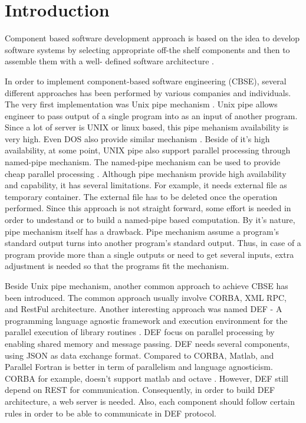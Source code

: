 \documentclass[conference]{IEEEtran}
\begin{document}
\section{Introduction}
Component based software development approach is based on
the idea to develop software systems by selecting appropriate
off-the shelf components and then to assemble them with a well-
defined software architecture \cite{kaur2010component}.

In order to implement component-based software engineering (CBSE), several different approaches has been performed by various companies and individuals. The very first implementation was Unix pipe mechanism \cite{mcilroy1968mass}. Unix pipe allows engineer to pass output of a single program into as an input of another program. Since a lot of server is UNIX or linux based, this pipe mehanism availability is very high. Even DOS also provide similar mechanism \cite{dos7command}. Beside of it's high availability, at some point, UNIX pipe also support parallel processing through named-pipe mechanism. The named-pipe mechanism can be used to provide cheap parallel processing \cite{conway2003parallel}. Although pipe mechanism provide high availability and capability, it has several limitations. For example, it needs external file as temporary container. The external file has to be deleted once the operation performed. Since this approach is not straight forward, some effort is needed in order to undestand or to build a named-pipe based computation. By it's nature, pipe mechanism itself has a drawback. Pipe mechanism assume a program's standard output turns into another program's standard output. Thus, in case of a program provide more than a single outputs or need to get several inputs, extra adjustment is needed so that the programs fit the mechanism.

Beside Unix pipe mechanism, another common approach to achieve CBSE has been introduced. The common approach usually involve CORBA, XML RPC, and RestFul architecture. Another interesting approach was named DEF - A programming language agnostic framework and execution environment for the parallel execution of library routines \cite{feilhauer2016def}. DEF focus on parallel processing by enabling shared memory and message passing. DEF needs several components, using JSON as data exchange format. Compared to CORBA, Matlab, and Parallel Fortran is better in term of parallelism and language agnosticism. CORBA for example, doesn't support matlab and octave \cite{feilhauer2016def}. However, DEF still depend on REST for communication. Consequently, in order to build DEF architecture, a web server is needed. Also, each component should follow certain rules in order to be able to communicate in DEF protocol.
\end{document}
